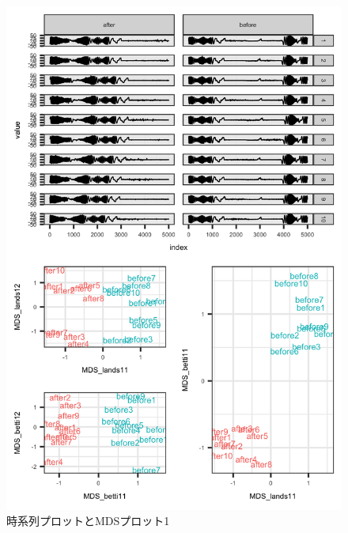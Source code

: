 \documentclass{jarticle}
\begin{document}
\begin{figure}[H]
	\begin{center}
		\includegraphics[width=15cm]{fig/MDS_plot1.png}
		\caption{時系列プロットとMDSプロット1}
		\label{fig:MDS_plot1}
	\end{center}
\end{figure}
\end{document}
